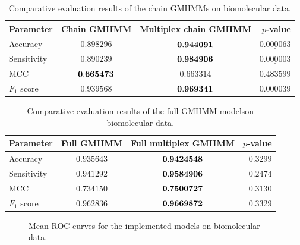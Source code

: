 \documentclass[12pt,a4paper,twoside,openright]{report}
\begin{document}
\begin{table}[h]\centering
\begin{tabular}{ l c c r } \toprule
{\bf Parameter} & {\bf Chain GMHMM} & {\bf Multiplex chain GMHMM} & {\bf $p$-value} \\ \midrule
Accuracy & $0.898296$ & $\bf 0.944091$ & $\underline{0.000063}$\\
Sensitivity & $0.890239$ & $\bf 0.984906$ & $\underline{0.000003}$\\
MCC & $\bf 0.665473$ & $0.663314$ & $0.483599$\\
$F_1$ score & $0.939568$ & $\bf 0.969341$ & $\underline{0.000039}$\\
\bottomrule
\end{tabular}
\caption[Evaluation results on the chain GMHMM on synthetic data]{\centering Comparative evaluation results of the chain GMHMMs on biomolecular data.}\label{tblbiodata1}
\end{table}
\begin{table}[h]\centering
\begin{tabular}{ l c c r } \toprule
{\bf Parameter} & {\bf Full GMHMM} & {\bf Full multiplex GMHMM} & {\bf $p$-value} \\ \midrule
Accuracy & $0.935643$ & $\bf 0.9424548$ & $0.3299$\\
Sensitivity & $0.941292$ & $\bf 0.9584906$ & $0.2474$\\
MCC & $0.734150$ & $\bf 0.7500727$ & $0.3130$\\
$F_1$ score & $0.962836$ & $\bf 0.9669872$ & $0.3329$\\
\bottomrule
\end{tabular}
\caption[Evaluation results on the full GMHMMs on biomolecular data]{\centering Comparative evaluation results of the full GMHMM models\linebreak on biomolecular data.}\label{tblbiodata2}
\end{table}
\begin{figure}[p]\centering
{}

\caption{Mean ROC curves for the implemented models on biomolecular data.}\label{figrocbio1}
\end{figure}
\end{document}
